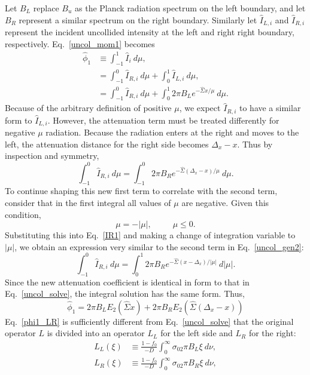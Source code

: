 Let $B_L$ replace $B_u$ as the Planck radiation spectrum on the left boundary,
and let $B_R$ represent a similar spectrum on the right boundary.  Similarly
let $\hat I_{L,i}$ and $\hat I_{R,i}$ represent the incident uncollided
intensity at the left and right right boundary, respectively.  Eq.\
\eqref{uncol_mom1} becomes
\begin{align}
\hat\phi_1&\equiv\int_{-1}^1 \hat I_i\ d\mu \nonumber ,\\
&=\int_{-1}^0 \hat I_{R,i}\ d\mu + 
  \int_0^1 \hat I_{L,i}\ d\mu \nonumber ,\\
&=\int_{-1}^0 \hat I_{R,i}\ d\mu +
  \int_0^1 2\pi B_Le^{-\hat\Sigma x/\mu}\ d\mu. \label{uncol_gen2}
\end{align}
Because of the arbitrary definition of positive $\mu$, we expect $\hat I_{R,i}$
to have a similar form to $\hat I_{L,i}$.  However, the attenuation term must
be treated differently for negative $\mu$ radiation.  Because the radiation
enters at the right and moves to the left, the attenuation distance for the
right side becomes $\Delta_x-x$. Thus by inspection and symmetry,
\begin{equation}
\int_{-1}^0 \hat I_{R,i}\ d\mu
  =\int_{-1}^0 2\pi B_R e^{-\hat\Sigma(\Delta_x-x)/\mu}\ d\mu.\label{IR1}
\end{equation}
To continue shaping this new first term to correlate with the second term,
consider that in the first integral all values of $\mu$ are negative.  Given
this condition,
\[\mu=-|\mu|, \hspace{30pt} \mu\leq0.\]
Substituting this into Eq.\ \eqref{IR1} and making a change of integration
variable to $|\mu|$, we obtain an expression very similar to the second term in
Eq.\ \eqref{uncol_gen2}:
\begin{equation}
\int_{-1}^0 \hat I_{R,i}\ d\mu = \int_0^1 2\pi B_R
  e^{-\hat\Sigma(x-\Delta_x)/|\mu|}\ d|\mu|.
\end{equation}
Since the new attenuation coefficient is identical in form to that in Eq.\
\eqref{uncol_solve}, the integral solution has the same form.  Thus,
\begin{equation}
\hat\phi_1=2\pi B_LE_2(\hat\Sigma x) +
  2\pi B_RE_2\left(\hat\Sigma(\Delta_x-x)\right) \label{phi1_LR}
\end{equation}
Eq.\ \eqref{phi1_LR} is sufficiently different from Eq.\ \eqref{uncol_solve}
that the original operator $L$ is divided into an operator $L_L$ for the left
side and $L_R$ for the right:
\begin{subequations}
\begin{align}\label{L_LR}
L_L(\xi)&\equiv\frac{1-f_0}{-D}\int_0^\infty\sigma_02\pi B_L\xi\ d\nu, \\
L_R(\xi)&\equiv\frac{1-f_0}{-D}\int_0^\infty\sigma_02\pi B_R\xi\ d\nu,
\end{align}
\end{subequations}
